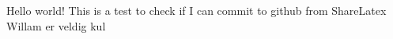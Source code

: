 \documentclass[10pt, a4paper]{report}
\begin{document}
  Hello world!
  This is a test to check if I can commit to github from ShareLatex
  Willam er veldig kul
\end{document}
